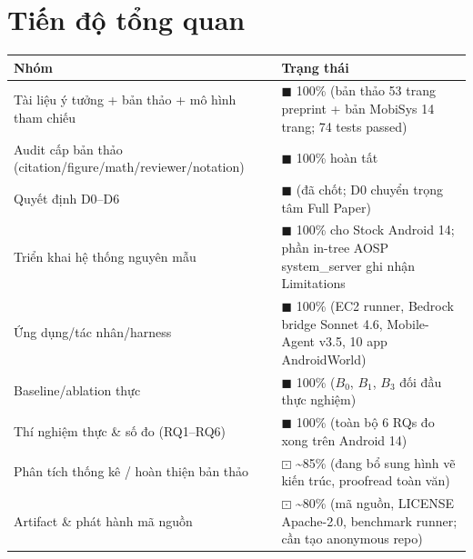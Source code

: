\documentclass[11pt,a4paper]{article}
\newcommand{\done}{\textcolor{shgreen}{$\blacksquare$}}
\newcommand{\doing}{\textcolor{shblue}{$\boxdot$}}
\begin{document}
\vspace{0.6em}
\section*{Tiến độ tổng quan}
\begin{tabularx}{\textwidth}{@{}X p{3.2cm}@{}}
\toprule
\textbf{Nhóm} & \textbf{Trạng thái} \\
\midrule
Tài liệu ý tưởng + bản thảo + mô hình tham chiếu & \done{} 100\% (bản thảo 53 trang preprint + bản MobiSys 14 trang; 74 tests passed) \\
Audit cấp bản thảo (citation/figure/math/reviewer/notation) & \done{} 100\% hoàn tất \\
Quyết định D0--D6 & \done{} (đã chốt; D0 chuyển trọng tâm Full Paper) \\
Triển khai hệ thống nguyên mẫu & \done{} 100\% cho Stock Android 14; phần in-tree AOSP system\_server ghi nhận Limitations \\
Ứng dụng/tác nhân/harness & \done{} 100\% (EC2 runner, Bedrock bridge Sonnet 4.6, Mobile-Agent v3.5, 10 app AndroidWorld) \\
Baseline/ablation thực & \done{} 100\% ($B_0$, $B_1$, $B_3$ đối đầu thực nghiệm) \\
Thí nghiệm thực \& số đo (RQ1--RQ6) & \done{} 100\% (toàn bộ 6 RQs đo xong trên Android 14) \\
Phân tích thống kê / hoàn thiện bản thảo & \doing{} \textasciitilde85\% (đang bổ sung hình vẽ kiến trúc, proofread toàn văn) \\
Artifact \& phát hành mã nguồn & \doing{} \textasciitilde80\% (mã nguồn, LICENSE Apache-2.0, benchmark runner; cần tạo anonymous repo) \\
\bottomrule
\end{tabularx}

\vspace{0.6em}
\end{document}
